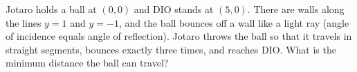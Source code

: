 Jotaro holds a ball at $(0,0)$ and DIO stands at $(5,0)$. There are walls along the lines $y=1$ and $y=-1$, and the ball bounces off a wall like a light ray (angle of incidence equals angle of reflection). Jotaro throws the ball so that it travels in straight segments, bounces exactly three times, and reaches DIO. What is the minimum distance the ball can travel?
